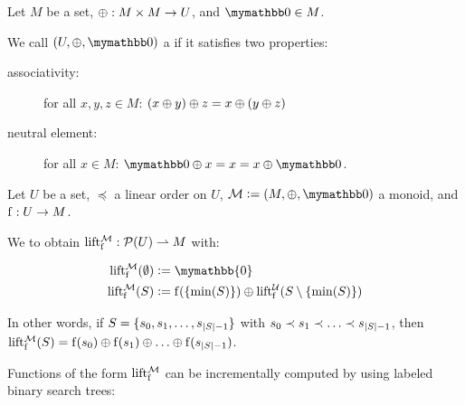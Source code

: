 \begin{definition}
Let $M$ be a set, $\oplus: M \times M \rightarrow U$, and $\neutraladd \in M$.

We call $(U, \groupaddsym, \neutraladd)$ a  if it satisfies two properties:

  \begin{description}
    \item[associativity:] for all $x, y, z \in M$: ${({x} \oplus {y})} \oplus {z} = {x} \oplus {({y} \oplus{z})}$
    \item[neutral element:] for all $x \in M$: $\groupadd{\neutraladd}{x} = x = \groupadd{x}{\neutraladd}$.
  \end{description}
\end{definition}

\begin{definition}
\label{def-lift}
Let $U$ be a set, $\preceq$ a linear order on $U$, $\mathcal{M} \defeq (M, \groupaddsym, \neutraladd)$ a monoid, and ${\operatorname{f}}: {U} \rightarrow {M}$.

We  to obtain ${\operatorname{lift_{\operatorname{f}}^{\mathcal{M}}}}: {\mathcal{P}({U})} \rightharpoonup{M}$ with:

\begin{align*}
\lift{\f}{\mathcal{M}}(\emptyset) &\defeq \mymathbb{0}\\
\lift{\f}{\mathcal{M}}(S) &\defeq \f(\set{\min(S)}) \oplus \lift{\f}{\mathcal{U}}(S \setminus \set{\min(S)})\\
\end{align*}

In other words, if $S = \{s_0, s_1, \ldots, s_{|{S}| - 1}\}$ with $s_0 \prec s_1 \prec \ldots \prec s_{|{S}| - 1}$, then $\operatorname{lift_{\operatorname{f}}^{\mathcal{M}}}(S) = {\operatorname{f}(s_0)} \oplus {{\operatorname{f}(s_1)} \oplus{{\ldots} \oplus{\operatorname{f}(s_{|{S}| - 1})}}}$.
\end{definition}

Functions of the form $\operatorname{lift_{\operatorname{f}}^{\mathcal{M}}}$ can be incrementally computed by using labeled binary search trees:

